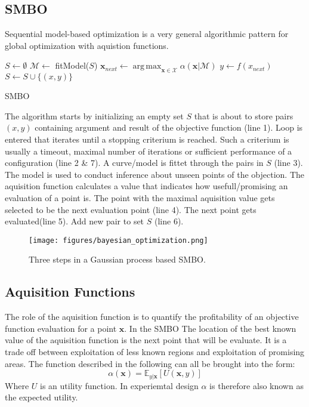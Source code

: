 \documentclass[english]{article}
\newcommand{\x}{\mathbf{x}}
\newcommand{\E}{\mathbb{E}}
\newcommand{\M}{\mathcal{M}}
\newcommand{\X}{\mathcal{X}}
\DeclareMathOperator*{\argmax}{arg\,max}
\begin{document}
\subsection{SMBO}
Sequential model-based optimization is a very general algorithmic pattern for global optimization with aquistion functions.

\begin{algorithm}[H]
\SetAlgoLined

$S \leftarrow \emptyset$\;
{
  $\mathcal{M} \leftarrow$ fitModel($S$)\;
  $\x_{next} \leftarrow \argmax_{\x \in \X} \alpha(\x|\M)$\;
  $y \leftarrow f(x_{next})$\;
  $S \leftarrow S \cup \{(x,y)\}$\;
}
\caption{SMBO}
\end{algorithm}

The algorithm starts by initializing an empty set $S$ that is about to store pairs $(x,y)$ containing argument and result of the objective function (line 1). Loop is entered that iterates until a stopping criterium is reached. Such a criterium is usually a timeout, maximal number of iterations or sufficient performance of a configuration (line 2 \& 7). A curve/model is fittet through the pairs in $S$ (line 3). The model is used to conduct inference about unseen points of the objection. The aquisition function calculates a value that indicates how usefull/promising an evaluation of a point is. The point with the maximal aquisition value gets selected to be the next evaluation point (line 4). The next point gets evaluated(line 5). Add new pair to set $S$ (line 6).

\begin{figure}
  \texttt{[image: figures/bayesian\_optimization.png]}
  \caption{Three steps in a Gaussian process based SMBO.}
  \label{bayesian optimization}
\end{figure}

\subsection{Aquisition Functions}
\label{aquifuncs}
The role of the aquisition function is to quantify the profitability of an objective function evaluation for a point $\x$. In the SMBO The location of the best known value of the aquisition function is the next point that will be evaluate. It is a trade off between exploitation of less known regions and exploitation of promising areas. The function described in the following can all be brought into the form:
\begin{equation}
  \alpha(\x) = \E_{y|\x}[U(\x,y)]
\end{equation}
Where $U$ is an utility function. In experiemtal design $\alpha$ is therefore also known as the expected utility.
\end{document}
